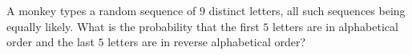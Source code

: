 A monkey types a random sequence of $9$ distinct letters, all such sequences being equally likely. What is the probability that the first $5$ letters are in alphabetical order and the last $5$ letters are in reverse alphabetical order?
